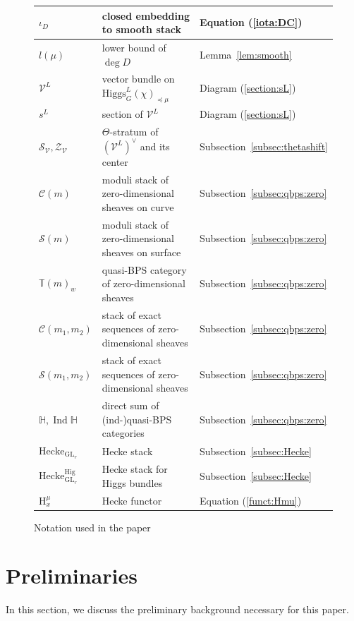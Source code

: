 \documentclass [11pt,oneside,a4paper,mathscr]{amsart}
\theoremstyle{definition}
\newcommand{\Ind}{\operatorname{Ind}}
\newcommand{\GL}{\operatorname{GL}}
\newcommand{\Hig}{\mathrm{Higgs}}
\begin{document}
\begin{figure}
{\begin{tabular}{|l|l|l|}
$\iota_D$ & closed embedding to smooth stack & Equation (\ref{iota:DC})
\\ \hline
$l(\mu)$ & lower bound of $\deg D$ & Lemma~\ref{lem:smooth}
\\ \hline
$\mathcal{V}^L$ & vector bundle on $\Hig_G^{L}(\chi)_{\preceq \mu}$ & Diagram (\ref{section:sL})
\\ \hline
$s^L$ & section of $\mathcal{V}^L$ & Diagram (\ref{section:sL})
\\ \hline
$\mathcal{S}_{\mathcal{V}}, \mathcal{Z}_{\mathcal{V}}$ & $\Theta$-stratum of $(\mathcal{V}^L)^{\vee}$ and its center & Subsection~\ref{subsec:thetashift}
\\ \hline
$\mathcal{C}(m)$ & moduli stack of zero-dimensional sheaves on curve & Subsection~\ref{subsec:qbps:zero}
\\ \hline
$\mathcal{S}(m)$ & moduli stack of zero-dimensional sheaves on surface & Subsection~\ref{subsec:qbps:zero}
\\ \hline $\mathbb{T}(m)_w$ & quasi-BPS category of zero-dimensional sheaves & Subsection~\ref{subsec:qbps:zero}
\\ \hline
$\mathcal{C}(m_1, m_2)$ & stack of exact sequences of zero-dimensional sheaves & Subsection~\ref{subsec:qbps:zero}
\\ \hline
$\mathcal{S}(m_1, m_2)$ & stack of exact sequences of zero-dimensional sheaves & Subsection~\ref{subsec:qbps:zero}
\\ \hline
$\mathbb{H}, \Ind\mathbb{H}$ & direct sum of (ind-)quasi-BPS categories & Subsection~\ref{subsec:qbps:zero}
\\ \hline $\mathrm{Hecke}_{\GL_r}$ & Hecke stack & Subsection~\ref{subsec:Hecke}
\\ \hline
$\mathrm{Hecke}_{\GL_r}^{\mathrm{Hig}}$ & Hecke stack for Higgs bundles& Subsection~\ref{subsec:Hecke}
\\ \hline
$\mathrm{H}_x^{\mu}$ & Hecke functor & Equation (\ref{funct:Hmu})
\\ \hline
	\end{tabular}
}
	\vspace{.5cm}
	 \caption{Notation used in the paper}
	 \notag
\end{figure}






\section{Preliminaries}\label{sec:QBcat}
In this section, we discuss the preliminary background necessary for this paper. 
\end{document}
